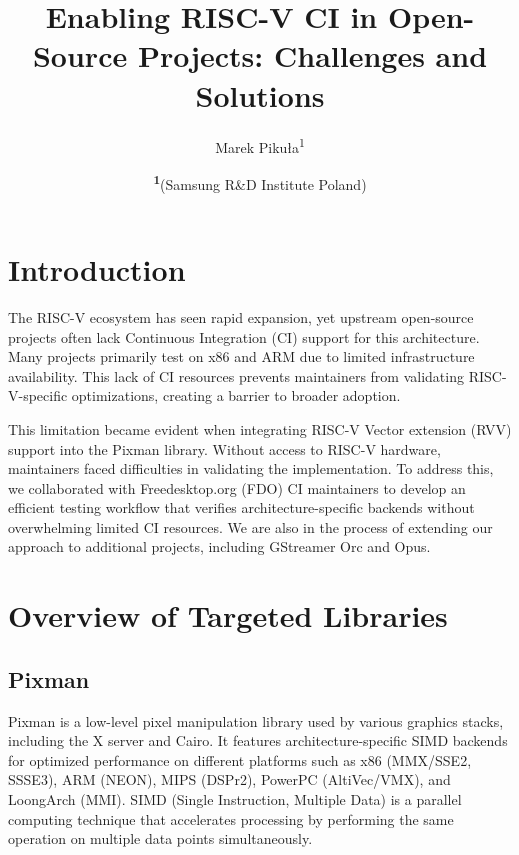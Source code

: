 \documentclass[
	a4paper, %
	10pt, %
	unnumberedsections, %
	twoside, %
]{LTJournalArticle}
\title{Enabling RISC-V CI in Open-Source Projects: Challenges and Solutions}
\author{%
	Marek Pikuła\textsuperscript{1}
}
\date{\footnotesize\textsuperscript{\textbf{1}}(Samsung R\&D Institute Poland)}
\begin{document}
\maketitle %


\section{Introduction}

The RISC-V ecosystem has seen rapid expansion, yet upstream open-source projects often lack Continuous Integration (CI) support for this architecture. Many projects primarily test on x86 and ARM due to limited infrastructure availability. This lack of CI resources prevents maintainers from validating RISC-V-specific optimizations, creating a barrier to broader adoption.

This limitation became evident when integrating RISC-V Vector extension (RVV) support into the Pixman library. Without access to RISC-V hardware, maintainers faced difficulties in validating the implementation. To address this, we collaborated with Freedesktop.org (FDO) CI maintainers to develop an efficient testing workflow that verifies architecture-specific backends without overwhelming limited CI resources. We are also in the process of extending our approach to additional projects, including GStreamer Orc and Opus.

\section{Overview of Targeted Libraries}

\subsection{Pixman}

Pixman\autocite{pixman} is a low-level pixel manipulation library used by various graphics stacks, including the X server and Cairo. It features architecture-specific SIMD backends for optimized performance on different platforms such as x86 (MMX/SSE2, SSSE3), ARM (NEON), MIPS (DSPr2), PowerPC (AltiVec/VMX), and LoongArch (MMI). SIMD (Single Instruction, Multiple Data) is a parallel computing technique that accelerates processing by performing the same operation on multiple data points simultaneously.
\end{document}
